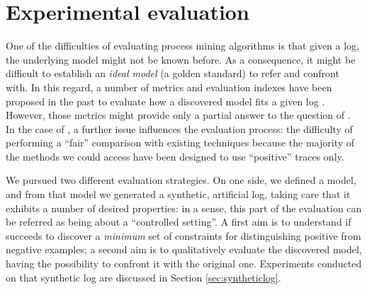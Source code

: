 
\newcommand{\todoinfc}[1]{\todo[inline,backgroundcolor=yellow]{FC: #1}}



\section{Experimental evaluation}
\label{sec:eval}


One of the difficulties of evaluating process mining algorithms is that given a log, the underlying model might not be known before. As a consequence, it might be difficult to establish an \emph{ideal model} (a golden standard) to refer and confront with. In this regard, a number of metrics and evaluation indexes have been proposed in the past to evaluate how a discovered model fits a given log \cite{2015-Adriansyah,2014-Broucke,2018-Ponce}. However, those metrics might provide only a partial answer to the question of . 
%
In the case of \nd, a further issue influences the evaluation process: the difficulty of performing a ``fair'' comparison with existing techniques because the majority of the methods we could access have been designed to use ``positive'' traces only.



We pursued two different evaluation strategies. On one side, we defined a model, and from that model we generated a synthetic, artificial log, taking care that it exhibits a number of desired properties: in a sense, this part of the evaluation can be referred as being about a ``controlled setting''. A first aim is to understand if \nd succeeds to discover a \emph{minimum} set of constraints for distinguishing positive from negative examples; a second aim is to qualitatively evaluate the discovered model, having the possibility to confront it with the original one. Experiments conducted on that synthetic log are discussed in Section \ref{sec:syntheticlog}.

